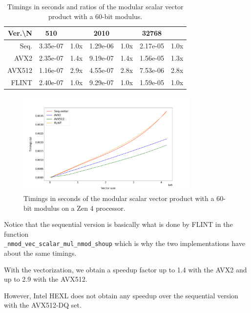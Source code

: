 \documentclass[a4paper]{article}
\begin{document}
\begin{table}[h!]
\begin{tabular}{|r|*{3}{c c|}}
        \hline
        \rowcolor{myGray}
        Ver.\textbackslash N & 510 & & 2010 & & 32768 & \\
        \hline
        \cellcolor{myGray} Seq. & 3.35e-07 & 1.0x & 1.29e-06 & 1.0x & 2.17e-05 & 1.0x \\
        \hline
        \cellcolor{myGray} AVX2 & 2.35e-07 & 1.4x & 9.19e-07 & 1.4x & 1.56e-05 & 1.3x \\
        \hline
        \cellcolor{myGray} AVX512 & 1.16e-07 & 2.9x & 4.55e-07 & 2.8x & 7.53e-06 & 2.8x \\
        \hline
        \cellcolor{myGray} FLINT & 2.40e-07 & 1.0x & 9.29e-07 & 1.0x & 1.59e-05 & 1.0x \\
        \hline
    \end{tabular}
    \caption{Timings in seconds and ratios of the modular scalar vector product with a 60-bit modulus.}
\end{table}

\begin{figure}[h!]
    \begin{center}
        \includegraphics[width=0.8\textwidth]{scalar-vector-mod_argiope.png}
    \end{center}
    \caption{Timings in seconds of the modular scalar vector product with a 60-bit modulus on a Zen 4 processor.}
\end{figure}

\newpage
Notice that the sequential version is basically what is done by FLINT in the function \\
\texttt{\_nmod\_vec\_scalar\_mul\_nmod\_shoup} which is why the two implementations have about the same timings.

With the vectorization, we obtain a speedup factor up to 1.4 with the AVX2 and up to 2.9 with the AVX512.

However, Intel HEXL does not obtain any speedup over the sequential version with the AVX512-DQ set.  
\end{document}
